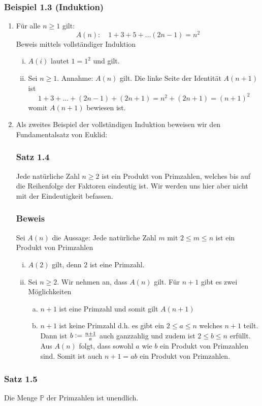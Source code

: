 \subsubsection*{Beispiel 1.3 (Induktion)}
\begin{enumerate}
\item Für alle $n\geq 1$ gilt: \[A(n): \quad 1+3+5+\dots (2n-1)=n^2\] Beweis mittels vollständiger Induktion
\begin{enumerate}[i)]
\item $A(i)$ lautet $1=1^2$ und gilt.
\item Sei $n\geq 1$. Annahme: $A(n)$ gilt. Die linke Seite der Identität $A(n+1)$ ist \[1+3+\dots +(2n-1)+(2n+1)=n^{2}+(2n+1)=(n+1)^2\] womit $A(n+1)$ bewiesen ist.
\end{enumerate}
\item Als zweites Beispiel der vollständigen Induktion beweisen wir den Fundamentalsatz von Euklid:
\subsubsection*{Satz 1.4}
Jede natürliche Zahl $n\geq 2$ ist ein Produkt von Primzahlen, welches bis auf die Reihenfolge der Faktoren eindeutig ist. Wir werden uns hier aber nicht mit der Eindeutigkeit befassen.
\subsubsection*{Beweis}
Sei $A(n)$ die Aussage: Jede natürliche Zahl $m$ mit $2\leq m\leq n$ ist ein Produkt von Primzahlen
\begin{enumerate}[i)]
\item $A(2)$ gilt, denn $2$ ist eine Primzahl.
\item Sei $n\geq 2$. Wir nehmen an, dass $A(n)$ gilt. Für $n+1$ gibt es zwei Möglichkeiten
\begin{enumerate}[a)]
\item $n+1$ ist eine Primzahl und somit gilt $A(n+1)$ 
\item $n+1$ ist keine Primzahl d.h. es gibt ein $2\leq a\leq n$ welches $n+1$ teilt. Dann ist $b\vcentcolon=\frac{n+1}{a}$ auch ganzzahlig und zudem ist $2\leq b\leq n$ erfüllt. Aus $A(n)$ folgt, dass sowohl $a$ wie $b$ ein Produkt von Primzahlen sind. Somit ist auch $n+1=ab$ ein Produkt von Primzahlen. 
\end{enumerate}
\end{enumerate}
\end{enumerate}
\subsubsection*{Satz 1.5}
Die Menge $\mathbb{P}$ der Primzahlen ist unendlich.

